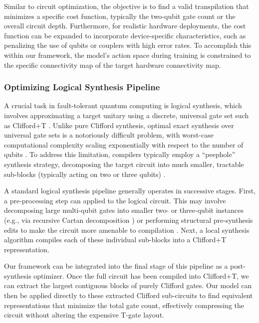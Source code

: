 \documentclass[conference]{IEEEtran}
\begin{document}
Similar to circuit optimization, the objective is to find a valid transpilation that minimizes a specific cost function, typically the two-qubit gate count or the overall circuit depth. Furthermore, for realistic hardware deployments, the cost function can be expanded to incorporate device-specific characteristics, such as penalizing the use of qubits or couplers with high error rates. 
To accomplish this within our framework, the model's action space during training is constrained to the specific connectivity map of the target hardware connectivity map.


\subsubsection{Optimizing Logical Synthesis Pipeline}



A crucial task in fault-tolerant quantum computing is logical synthesis, which involves approximating a target unitary using a discrete, universal gate set such as Clifford+T \cite{kitaev_quantum_1997}. Unlike pure Clifford synthesis, optimal exact synthesis over universal gate sets is a notoriously difficult problem, with worst-case computational complexity scaling exponentially with respect to the number of qubits \cite{sk_alg, nielsen2000quantum}. To address this limitation, compilers typically employ a ``peephole'' synthesis strategy, decomposing the target circuit into much smaller, tractable sub-blocks (typically acting on two or three qubits) \cite{Bravyi2021cliffordcircuit}.

A standard logical synthesis pipeline generally operates in successive stages. First, a pre-processing step can applied to the logical circuit. This may involve decomposing large multi-qubit gates into smaller two- or three-qubit instances (e.g., via recursive Cartan decomposition \cite{cartan_sur_1926, wierichs_recursive_2025}) or performing structural pre-synthesis edits to make the circuit more amenable to compilation \cite{qpresyn}. Next, a local synthesis algorithm compiles each of these individual sub-blocks into a Clifford+T representation. 

Our framework can be integrated into the final stage of this pipeline as a post-synthesis optimizer. Once the full circuit has been compiled into Clifford+T, we can extract the largest contiguous blocks of purely Clifford gates. Our model can then be applied directly to these extracted Clifford sub-circuits to find equivalent representations that minimize the total gate count, effectively compressing the circuit without altering the expensive T-gate layout. 
\end{document}
